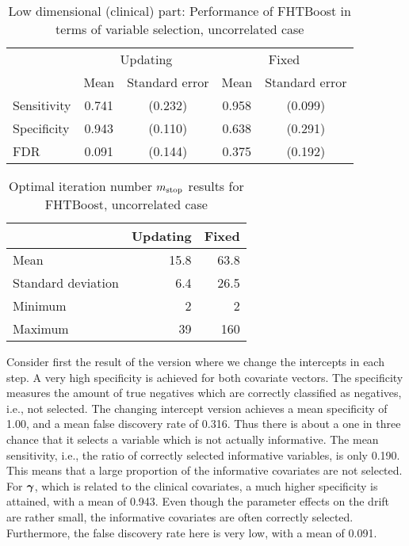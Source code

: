 \begin{table}
\caption{Low dimensional (clinical) part: Performance of FHTBoost in terms of variable selection, uncorrelated case}
\label{table:uncorrelated-mu}
\centering
\begin{tabular}{l|cc|cc}
\toprule
& \multicolumn{2}{c}{Updating} & \multicolumn{2}{c}{Fixed} \\
& Mean & Standard error & Mean & Standard error \\
\hline
Sensitivity & 0.741 & (0.232) & 0.958 & (0.099) \\
Specificity & 0.943 & (0.110) & 0.638 & (0.291) \\
FDR         & 0.091 & (0.144) & 0.375 & (0.192) \\
\bottomrule
\end{tabular}
\end{table}

\begin{table}
\caption{Optimal iteration number $m_{\text{stop}}$ results for FHTBoost, uncorrelated case}
\label{table:uncorrelated-mstop}
\centering
\begin{tabular}{l|rr}
\toprule
& Updating & Fixed \\
\hline
Mean               &  15.8  &  63.8  \\
Standard deviation &   6.4  &  26.5  \\
Minimum            &     2  &     2  \\
Maximum            &    39  &   160  \\
\bottomrule
\end{tabular}
\end{table}
Consider first the result of the version where we change the intercepts in each step.
A very high specificity is achieved for both covariate vectors.
The specificity measures the amount of true negatives which are correctly classified as negatives, i.e., not selected.
The changing intercept version achieves a mean specificity of 1.00, and a mean false discovery rate of 0.316.
Thus there is about a one in three chance that it selects a variable which is not actually informative.
The mean sensitivity, i.e., the ratio of correctly selected informative variables, is only 0.190.
This means that a large proportion of the informative covariates are not selected.
For $\boldsymbol{\gamma}$, which is related to the clinical covariates, a much higher specificity is attained, with a mean of 0.943.
Even though the parameter effects on the drift are rather small, the informative covariates are often correctly selected.
Furthermore, the false discovery rate here is very low, with a mean of 0.091.

